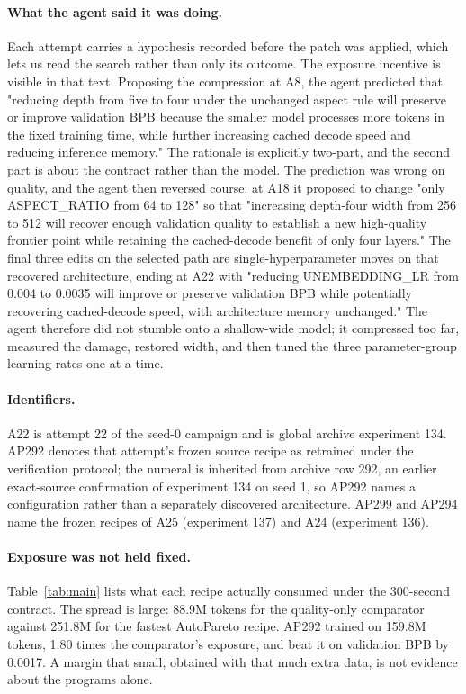 \documentclass{article}
\begin{document}
\paragraph{What the agent said it was doing.} Each attempt carries a hypothesis recorded before the patch was applied, which lets us read the search rather than only its outcome. The exposure incentive is visible in that text. Proposing the compression at A8, the agent predicted that "reducing depth from five to four under the unchanged aspect rule will preserve or improve validation BPB because the smaller model processes more tokens in the fixed training time, while further increasing cached decode speed and reducing inference memory." The rationale is explicitly two-part, and the second part is about the contract rather than the model. The prediction was wrong on quality, and the agent then reversed course: at A18 it proposed to change "only ASPECT\_RATIO from 64 to 128" so that "increasing depth-four width from 256 to 512 will recover enough validation quality to establish a new high-quality frontier point while retaining the cached-decode benefit of only four layers." The final three edits on the selected path are single-hyperparameter moves on that recovered architecture, ending at A22 with "reducing UNEMBEDDING\_LR from 0.004 to 0.0035 will improve or preserve validation BPB while potentially recovering cached-decode speed, with architecture memory unchanged." The agent therefore did not stumble onto a shallow-wide model; it compressed too far, measured the damage, restored width, and then tuned the three parameter-group learning rates one at a time.

\paragraph{Identifiers.} A22 is attempt 22 of the seed-0 campaign and is global archive experiment 134. AP292 denotes that attempt's frozen source recipe as retrained under the verification protocol; the numeral is inherited from archive row 292, an earlier exact-source confirmation of experiment 134 on seed 1, so AP292 names a configuration rather than a separately discovered architecture. AP299 and AP294 name the frozen recipes of A25 (experiment 137) and A24 (experiment 136).

\paragraph{Exposure was not held fixed.} Table~\ref{tab:main} lists what each recipe actually consumed under the 300-second contract. The spread is large: 88.9M tokens for the quality-only comparator against 251.8M for the fastest AutoPareto recipe. AP292 trained on 159.8M tokens, 1.80 times the comparator's exposure, and beat it on validation BPB by 0.0017. A margin that small, obtained with that much extra data, is not evidence about the programs alone.
\end{document}
